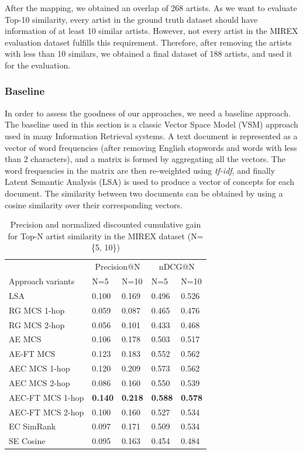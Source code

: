After the mapping, we obtained an overlap of 268 artists.
As we want to evaluate Top-10 similarity, every artist in the ground truth dataset should have information of at least 10 similar artists. However, not every artist in the MIREX evaluation dataset fulfills this requirement. Therefore, after removing the artists with less than 10 similars, we obtained a final dataset of 188 artists, and used it for the evaluation.

\subsubsection{Baseline}
In order to assess the goodness of our approaches, we need a baseline approach. The baseline used in this section is a classic Vector Space Model (VSM) approach used in many Information Retrieval systems. A text document is represented as a vector of word frequencies (after removing English stopwords and words with less than 2 characters), and a matrix is formed by aggregating all the vectors. The word frequencies in the matrix are then re-weighted using \textit{tf-idf}, and finally Latent Semantic Analysis (LSA) \citep{Deerwesteretal1990} is used to produce a vector of concepts for each document. The similarity between two documents can be obtained by using a cosine similarity over their corresponding vectors.

\begin{table}[]
\small
\centering
	\begin{tabular}{  lllll }
 	\toprule
& \multicolumn{2}{c}{Precision@N} & \multicolumn{2}{c}{nDCG@N} \\
\cmidrule(lr){2-3}
\cmidrule(lr){4-5}
	Approach variants & N=5 & N=10 & N=5 & N=10 \\
	\midrule
LSA & 0.100 & 0.169 & 0.496 & 0.526 \\
RG MCS 1-hop & 0.059 & 0.087 & 0.465 & 0.476 \\
RG MCS 2-hop & 0.056 & 0.101 & 0.433 & 0.468 \\
AE MCS & 0.106 & 0.178 & 0.503  & 0.517 \\
AE-FT MCS & 0.123 & 0.183 & 0.552 & 0.562 \\
AEC MCS 1-hop & 0.120 & 0.209 & 0.573 & 0.562 \\
AEC MCS 2-hop & 0.086 & 0.160 & 0.550 & 0.539 \\
AEC-FT MCS 1-hop & \textbf{0.140} & \textbf{0.218} & \textbf{0.588} & \textbf{0.578} \\
AEC-FT MCS 2-hop & 0.100 & 0.160 & 0.527 & 0.534 \\
EC SimRank & 0.097& 0.171 &  0.509 & 0.534 \\
SE Cosine & 0.095 & 0.163 & 0.454 & 0.484 \\
\bottomrule	
	\end{tabular}
	\caption[Precision and nDCG for Top-N artist similarity in the MIREX dataset.]{Precision and normalized discounted cumulative gain for Top-N artist similarity in the MIREX dataset (N=\{5, 10\})}	
	\label{tbl:similarity:res_mirex}
\end{table}

